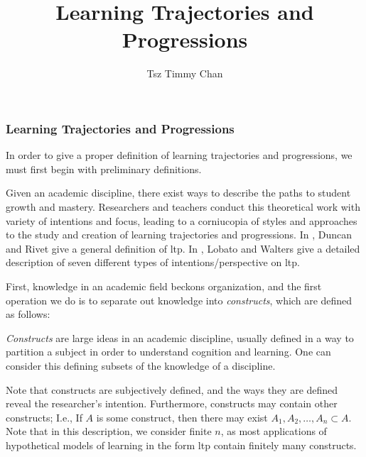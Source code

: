 \documentclass{TC}
\title{Learning Trajectories and Progressions}	%
\author{Tsz Timmy Chan}	%
\begin{document}
\subsubsection{Learning Trajectories and Progressions}
In order to give a proper definition of learning trajectories and progressions, we must first begin with preliminary definitions.

Given an academic discipline, there exist ways to describe the paths to student growth and mastery. Researchers and teachers conduct this theoretical work with variety of intentions and focus, leading to a corniucopia of styles and approaches to the study and creation of learning trajectories and progressions. In  \parencite{duncan_learning_2018}, Duncan and Rivet give a general definition of \gls{ltp}. In \parencite{lobato_taxonomy_2017}, Lobato and Walters give a detailed description of seven different types of intentions/perspective on \gls{ltp}. 
 
First, knowledge in an academic field beckons organization, and the first operation we do is to separate out knowledge into \emph{constructs}, which are defined as follows:

\begin{mdframed}
\begin{definition}[Construct]
\emph{Constructs} are large ideas in an academic discipline, usually defined in a way to partition a subject in order to understand cognition and learning. One can consider this defining subsets of the knowledge of a discipline.  \end{definition}
\end{mdframed}

Note that constructs are subjectively defined, and the ways they are defined reveal the researcher's intention. Furthermore, constructs may contain other constructs; I.e., If $A$ is some construct, then there may exist $A_1, A_2, \ldots, A_n \subset A$. Note that in this description, we consider finite $n$, as most applications of hypothetical models of learning in the form \gls{ltp} contain finitely many constructs.
\end{document}
